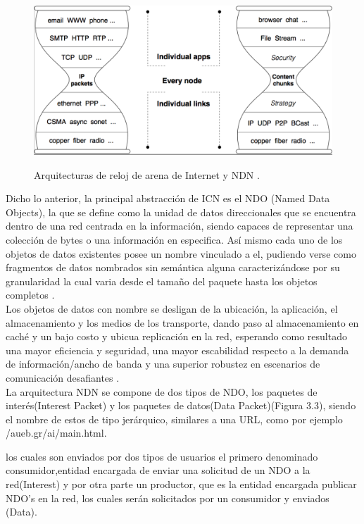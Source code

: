 \documentclass[12pt]{ociamthesis}  %
\begin{document}
	\begin{figure}[!htb]
		\centering
		\includegraphics[width=12cm]{Protocolo_IP_vs_NDN.png}\\
		\caption{Arquitecturas de reloj de arena de Internet y NDN \cite{named_data_networking}.}
		\label{fig:mesh1}
	\end{figure}

Dicho lo anterior, la principal abstracción de ICN es el NDO (Named Data Objects), la que se define como la unidad de datos direccionales que se encuentra dentro de una red centrada en la información, siendo capaces de representar una colección de bytes o una información en especifica. Así mismo cada uno de los objetos de datos existentes posee un nombre vinculado a el, pudiendo verse como fragmentos de datos nombrados sin semántica alguna caracterizándose por su granularidad la cual varia desde el tamaño del paquete hasta los objetos completos \cite{kutscher2016information}\cite{ahlgren2012survey}.\\

Los objetos de datos con nombre se desligan de la ubicación, la aplicación, el almacenamiento y los medios de los transporte, dando paso al almacenamiento en caché y un bajo costo y ubicua replicación en la red, esperando como resultado una mayor eficiencia y seguridad, una mayor escabilidad respecto a la demanda de información/ancho de banda y una superior robustez en escenarios de comunicación desafiantes \cite{kutscher2016information}.\\

La arquitectura NDN se compone de dos tipos de NDO, los paquetes de interés(Interest Packet) y los paquetes de datos(Data Packet)(Figura 3.3), siendo el nombre de estos de tipo jerárquico, similares a una URL, como por ejemplo /aueb.gr/ai/main.html.

los cuales son enviados por dos tipos de usuarios el primero denominado consumidor,entidad encargada de enviar una solicitud de un NDO a la red(Interest) y por otra parte un productor, que es la entidad encargada publicar NDO's en la red, los cuales serán solicitados por un consumidor y enviados (Data).\\
\end{document}
